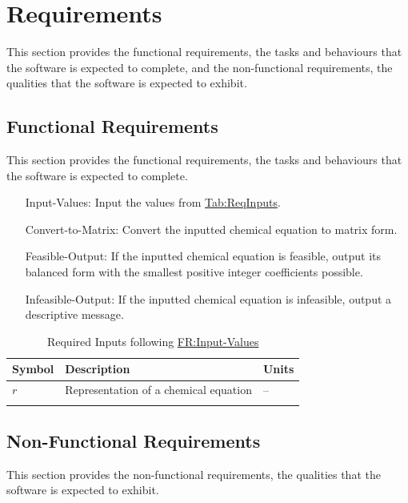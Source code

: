 \documentclass[12pt]{article}
\begin{document}
\section{Requirements}
\label{Sec:Requirements}
This section provides the functional requirements, the tasks and behaviours that the software is expected to complete, and the non-functional requirements, the qualities that the software is expected to exhibit.

\subsection{Functional Requirements}
\label{Sec:FRs}
This section provides the functional requirements, the tasks and behaviours that the software is expected to complete.

\begin{itemize}
\item[Input-Values:\phantomsection\label{inputValues}]{Input the values from \hyperref[Table:ReqInputs]{Tab:ReqInputs}.}
\item[Convert-to-Matrix:\phantomsection\label{convertMatrix}]{Convert the inputted chemical equation to matrix form.}
\item[Feasible-Output:\phantomsection\label{feasOut}]{If the inputted chemical equation is feasible, output its balanced form with the smallest positive integer coefficients possible.}
\item[Infeasible-Output:\phantomsection\label{infeasOut}]{If the inputted chemical equation is infeasible, output a descriptive message.}
\end{itemize}
\begin{longtable}{l l l}
\toprule
\textbf{Symbol} & \textbf{Description} & \textbf{Units}
\\
\midrule
\endhead
$r$ & Representation of a chemical equation & --
\\
\bottomrule
\caption{Required Inputs following \hyperref[inputValues]{FR:Input-Values}}
\label{Table:ReqInputs}
\end{longtable}
\subsection{Non-Functional Requirements}
\label{Sec:NFRs}
This section provides the non-functional requirements, the qualities that the software is expected to exhibit.
\end{document}
